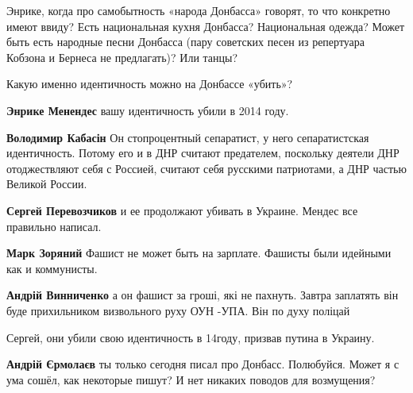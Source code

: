 \begin{itemize}
\begin{itemize}
Энрике, когда про самобытность «народа Донбасса» говорят, то что конкретно
имеют ввиду? Есть национальная кухня Донбасса? Национальная одежда? Может быть
есть народные песни Донбасса (пару советских песен из репертуара Кобзона и
Бернеса не предлагать)? Или танцы?

Какую именно идентичность можно на Донбассе «убить»?

\textbf{Энрике Менендес} вашу идентичность убили в 2014 году.

\textbf{Володимир Кабасін} Он стопроцентный сепаратист, у него сепаратистская идентичность. Потому его и в ДНР считают предателем, поскольку деятели ДНР отоджествляют себя с Россией, считают себя русскими патриотами, а ДНР частью Великой России.

\textbf{Сергей Перевозчиков} и ее продолжают убивать в Украине. Мендес все правильно написал.

\textbf{Марк Зоряний} Фашист не может быть на зарплате. Фашисты были идейными как и коммунисты.

\textbf{Андрій Винниченко} а он фашист за гроші, які не пахнуть. Завтра заплатять він буде прихильником визвольного руху ОУН -УПА. Він по духу поліцай

Сергей, они убили свою идентичность в 14году, призвав путина в Украину.
\end{itemize} %

\textbf{Андрій Єрмолаєв} ты только сегодня писал про Донбасс. Полюбуйся. Может я с ума сошёл, как некоторые пишут? И нет никаких поводов для возмущения?

\begin{itemize} %


\end{itemize}
\end{itemize}
